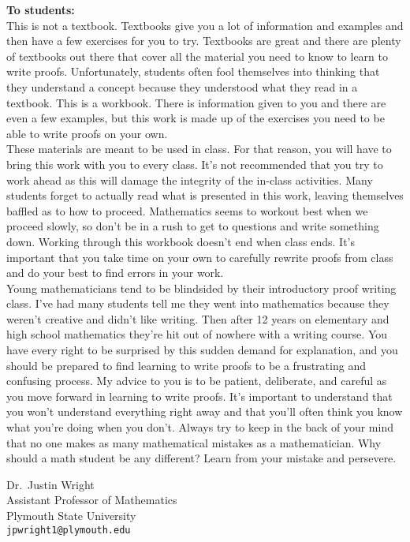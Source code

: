 \noindent \textbf{To students:}\\
This is not a textbook.  Textbooks give you a lot of information and examples and then have a few exercises for you to try.  Textbooks are great and there are plenty of textbooks out there that cover all the material you need to know to learn to write proofs.  Unfortunately, students often fool themselves into thinking that they understand a concept because they understood what they read in a textbook.  This is a workbook.  There is information given to you and there are even a few examples, but this work is made up of the exercises you need to be able to write proofs on your own.\\

These materials are meant to be used in class.  For that reason, you will have to bring this work with you to every class.  It's not recommended that you try to work ahead as this will damage the integrity of the in-class activities.  Many students forget to actually read what is presented in this work, leaving themselves baffled as to how to proceed.  Mathematics seems to workout best when we proceed slowly, so don't be in a rush to get to questions and write something down.  Working through this workbook doesn't end when class ends.  It's important that you take time on your own to carefully rewrite proofs from class and do your best to find errors in your work.\\

Young mathematicians tend to be blindsided by their introductory proof writing class.  I've had many students tell me they went into mathematics because they weren't creative and didn't like writing.  Then after 12 years on elementary and high school mathematics they're hit out of nowhere with a writing course.  You have every right to be surprised by this sudden demand for explanation, and you should be prepared to find learning to write proofs to be a frustrating and confusing process.  My advice to you is to be patient, deliberate, and careful as you move forward in learning to write proofs.  It's important to understand that you won't understand everything right away and that you'll often think you know what you're doing when you don't.  Always try to keep in the back of your mind that no one makes as many mathematical mistakes as a mathematician.  Why should a math student be any different?  Learn from your mistake and persevere.    

\begin{flushright}
Dr.~Justin Wright\\
Assistant Professor of Mathematics\\
Plymouth State University\\
\texttt{jpwright1@plymouth.edu}
\end{flushright}





